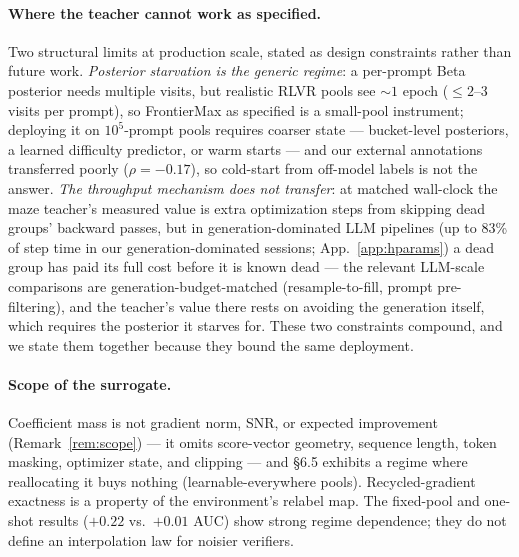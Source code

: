 \paragraph{Where the teacher cannot work as specified.} Two structural
limits at production scale, stated as design constraints rather than
future work. \emph{Posterior starvation is the generic regime}: a
per-prompt Beta posterior needs multiple visits, but realistic RLVR
pools see ${\sim}1$ epoch (${\le}2$--3 visits per prompt), so
FrontierMax as specified is a small-pool instrument; deploying it on
$10^5$-prompt pools requires coarser state --- bucket-level posteriors,
a learned difficulty predictor, or warm starts --- and our external
annotations transferred poorly ($\rho{=}-0.17$), so cold-start from
off-model labels is not the answer. \emph{The throughput mechanism
does not transfer}: at matched wall-clock the maze teacher's measured
value is extra optimization steps from skipping dead groups' backward
passes, but in generation-dominated LLM pipelines (up to 83\% of step
time in our generation-dominated sessions; App.~\ref{app:hparams})
a dead group has paid its full cost before it is known dead --- the
relevant LLM-scale comparisons are generation-budget-matched
(resample-to-fill, prompt pre-filtering), and the teacher's value
there rests on avoiding the generation itself, which requires the
posterior it starves for. These two constraints compound, and we state
them together because they bound the same deployment.

\paragraph{Scope of the surrogate.} Coefficient mass is not gradient
norm, SNR, or expected improvement (Remark~\ref{rem:scope}) --- it
omits score-vector geometry, sequence length, token masking, optimizer
state, and clipping --- and \S 6.5
exhibits a regime where reallocating it buys nothing
(learnable-everywhere pools). Recycled-gradient exactness is a property
of the environment's relabel map. The fixed-pool and one-shot results
($+0.22$ vs.\ $+0.01$ AUC) show strong regime dependence; they do not
define an interpolation law for noisier verifiers.

